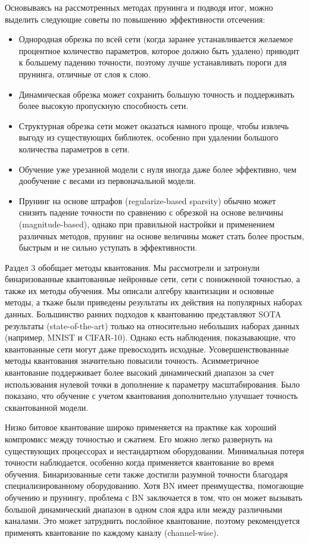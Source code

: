 \documentclass[oneside,final,12pt]{extreport}
\begin{document}
Основываясь на рассмотренных методах прунинга и подводя итог, можно выделить следующие советы по повышению эффективности отсечения:
\begin{itemize}
\item Однородная обрезка по всей сети (когда заранее устанавливается желаемое процентное количество параметров, которое должно быть удалено) приводит к большему падению точности, поэтому лучше устанавливать пороги для прунинга, отличные от слоя к слою.
\item Динамическая обрезка может сохранить большую точность и поддерживать более высокую пропускную способность сети.
\item Структурная обрезка сети может оказаться намного проще, чтобы извлечь выгоду из существующих библиотек, особенно при удалении большого количества параметров в сети.
\item Обучение уже урезанной модели с нуля иногда даже более эффективно, чем дообучение с весами из первоначальной модели.
\item Прунинг на основе штрафов (regularize-based sparsity) обычно может снизить падение точности по сравнению с обрезкой на основе величины (magnitude-based), однако при правильной настройки и применением различных методов, прунинг на основе величины может стать более простым, быстрым и не сильно уступать в эффективности.
\end{itemize}

Раздел 3 обобщает методы квантования. Мы рассмотрели и затронули бинаризованные квантованные нейронные сети, сети с пониженной точностью, а также их методы обучения. Мы описали алгебру квантизации и основные методы, а ткаже были приведены результаты их действия на популярных наборах данных.  Большинство ранних подходов к квантованию представляют SOTA результаты (state-of-the-art) только на относительно небольших наборах данных (например, MNIST и CIFAR-10). Однако есть наблюдения, показывающие, что квантованные сети могут даже превосходить исходные. Усовершенствованные методы квантования значительно повысили точность. Асимметричное квантование поддерживает более высокий динамический диапазон за счет использования нулевой точки в дополнение к параметру масштабирования. Было показано, что обучение с учетом квантования дополнительно улучшает точность сквантованной модели. 

Низко битовое квантование широко применяется на практике как хороший компромисс между точностью и сжатием. Его можно легко развернуть на существующих процессорах и нестандартном оборудовании. Минимальная потеря точности наблюдается, особенно когда применяется квантование во время обучения. Бинаризованные сети также достигли разумной точности благодаря специализированному оборудованию. Хотя BN имеет преимущества, помогающие обучению и прунингу, проблема с BN заключается в том, что он может вызывать большой динамический диапазон в одном слоя ядра или между различными каналами. Это может затруднить послойное квантование, поэтому рекомендуется применять квантование по каждому каналу (channel-wise).
\end{document}
